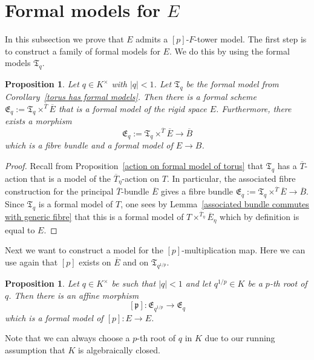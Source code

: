 \documentclass[10pt,oneside]{amsart}
\newtheorem{proposition}[theorem]{Proposition}
\theoremstyle{definition}
\theoremstyle{remark}
\begin{document}
	\section{Formal models for $E$}
	In this subsection we prove that $E$ admits a $[p]$-$F$-tower model. The first step is to construct a family of formal models for $E$. We do this by using the formal models $\mathfrak T_q$.
	\begin{proposition}
	Let $q\in K^\times$ with $|q|<1$. Let $\mathfrak T_q$ be the formal model from Corollary~\ref{torus has formal models}. Then there is a formal scheme $\mathfrak E_q :=\mathfrak T_q \times^{\overline{T}}\overline{E}$ that is a formal model of the rigid space $E$. Furthermore, there exists a morphism
	\[\mathfrak E_q :=\mathfrak T_q \times^{\overline{T}} \overline{E} \rightarrow \overline{B} \]
	which is a fibre bundle and a formal model of $E\rightarrow B$.
	\end{proposition}
	\begin{proof}
		Recall from Proposition~\ref{action on formal model of torus} that $\mathfrak T_q$ has a $\overline{T}$-action that is a model of the $\overline{T}_\eta$-action on $T$. In particular, the associated fibre construction for the principal $\overline{T}$-bundle $\overline{E}$ gives a fibre bundle $\mathfrak E_q :=\mathfrak T_q \times^{\overline{T}} \overline{E} \rightarrow \overline{B}$. Since $\mathfrak T_q$ is a formal model of $T$, one sees by Lemma~\ref{associated bundle commutes with generic fibre} that this is a formal model of $T\times^{\overline{T}_\eta}\overline{E}_\eta$ which by definition is equal to $E$.
	\end{proof}
	Next we want to construct a model for the $[p]$-multiplication map. Here we can use again that $[p]$ exists on $\overline{E}$ and on $\mathfrak T_{q^{1/p}}$.
	\begin{proposition}\label{formal model of p-multiplication on E}
		Let $q\in K^\times$ be such that $|q|<1$ and let $q^{1/p}\in K$ be a $p$-th root of $q$. Then there is an affine morphism
		\[[\mathfrak p]:\mathfrak E_{q^{1/p}} \rightarrow  \mathfrak E_{q}\]
		which is a formal model of $[p]:E\rightarrow E$.
	\end{proposition}
		Note that we can always choose a $p$-th root of $q$ in $K$ due to our running assumption that $K$ is algebraically closed.
\end{document}
